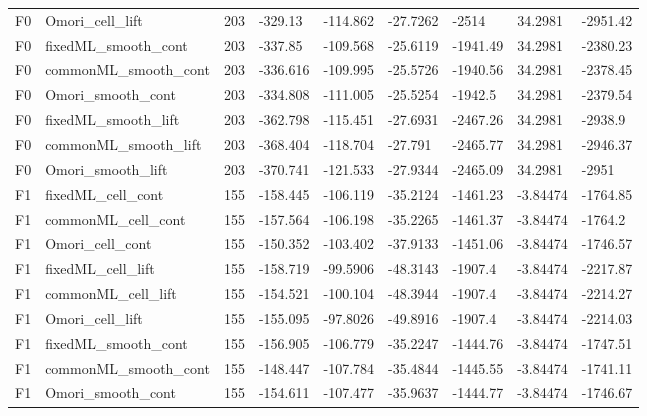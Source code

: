 \begin{longtable}
{}F0 & Omori\_\allowbreak{}cell\_\allowbreak{}lift & 203 & -329.13 & -114.862 & -27.7262 & -2514 & 34.2981 & -2951.42 \\
{}F0 & fixedML\_\allowbreak{}smooth\_\allowbreak{}cont & 203 & -337.85 & -109.568 & -25.6119 & -1941.49 & 34.2981 & -2380.23 \\
{}F0 & commonML\_\allowbreak{}smooth\_\allowbreak{}cont & 203 & -336.616 & -109.995 & -25.5726 & -1940.56 & 34.2981 & -2378.45 \\
{}F0 & Omori\_\allowbreak{}smooth\_\allowbreak{}cont & 203 & -334.808 & -111.005 & -25.5254 & -1942.5 & 34.2981 & -2379.54 \\
{}F0 & fixedML\_\allowbreak{}smooth\_\allowbreak{}lift & 203 & -362.798 & -115.451 & -27.6931 & -2467.26 & 34.2981 & -2938.9 \\
{}F0 & commonML\_\allowbreak{}smooth\_\allowbreak{}lift & 203 & -368.404 & -118.704 & -27.791 & -2465.77 & 34.2981 & -2946.37 \\
{}F0 & Omori\_\allowbreak{}smooth\_\allowbreak{}lift & 203 & -370.741 & -121.533 & -27.9344 & -2465.09 & 34.2981 & -2951 \\
{}F1 & fixedML\_\allowbreak{}cell\_\allowbreak{}cont & 155 & -158.445 & -106.119 & -35.2124 & -1461.23 & -3.84474 & -1764.85 \\
{}F1 & commonML\_\allowbreak{}cell\_\allowbreak{}cont & 155 & -157.564 & -106.198 & -35.2265 & -1461.37 & -3.84474 & -1764.2 \\
{}F1 & Omori\_\allowbreak{}cell\_\allowbreak{}cont & 155 & -150.352 & -103.402 & -37.9133 & -1451.06 & -3.84474 & -1746.57 \\
{}F1 & fixedML\_\allowbreak{}cell\_\allowbreak{}lift & 155 & -158.719 & -99.5906 & -48.3143 & -1907.4 & -3.84474 & -2217.87 \\
{}F1 & commonML\_\allowbreak{}cell\_\allowbreak{}lift & 155 & -154.521 & -100.104 & -48.3944 & -1907.4 & -3.84474 & -2214.27 \\
{}F1 & Omori\_\allowbreak{}cell\_\allowbreak{}lift & 155 & -155.095 & -97.8026 & -49.8916 & -1907.4 & -3.84474 & -2214.03 \\
{}F1 & fixedML\_\allowbreak{}smooth\_\allowbreak{}cont & 155 & -156.905 & -106.779 & -35.2247 & -1444.76 & -3.84474 & -1747.51 \\
{}F1 & commonML\_\allowbreak{}smooth\_\allowbreak{}cont & 155 & -148.447 & -107.784 & -35.4844 & -1445.55 & -3.84474 & -1741.11 \\
{}F1 & Omori\_\allowbreak{}smooth\_\allowbreak{}cont & 155 & -154.611 & -107.477 & -35.9637 & -1444.77 & -3.84474 & -1746.67 \\

\end{longtable}
